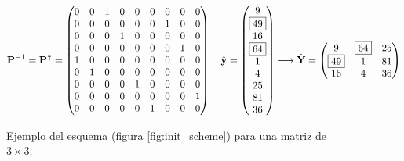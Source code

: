 \begin{figure}[H]
	\[
	\mathbf{P}^{-1} = \mathbf{P}^\intercal = \left(
		\begin{matrix}
			0&0&1&0&0&0&0&0&0\\
			0&0&0&0&0&0&1&0&0\\
			0&0&0&1&0&0&0&0&0\\
			0&0&0&0&0&0&0&1&0\\
			1&0&0&0&0&0&0&0&0\\
			0&1&0&0&0&0&0&0&0\\
			0&0&0&0&1&0&0&0&0\\
			0&0&0&0&0&0&0&0&1\\
			0&0&0&0&0&1&0&0&0\\
		\end{matrix}
	\right)
	\quad
	\hat{\mathbf{y}} = \left(
		\begin{matrix}
			9\\\boxed{49}\\16\\\boxed{64}\\1\\4\\25\\81\\36
		\end{matrix}
	\right) \longrightarrow 
	\hat{\mathbf{Y}} = \left(
		\begin{matrix}
			9 & \boxed{64} & 25\\
			\boxed{49} &  1 & 81\\
			16 &  4 & 36\\
		\end{matrix}
	\right)
	\]
	\caption{Ejemplo del esquema (figura \ref{fig:init_scheme}) para una matriz de $3 \times 3$.}
	\label{ex:init_scheme}
\end{figure}


